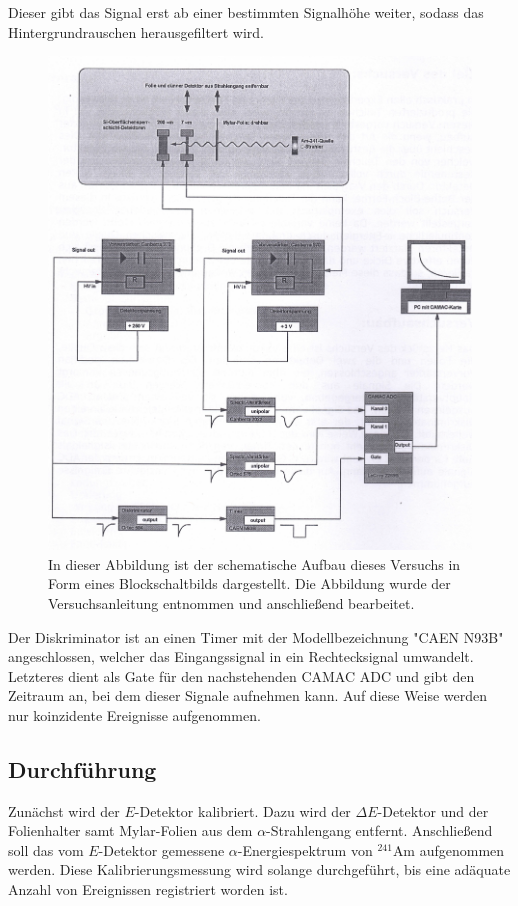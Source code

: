 Dieser gibt das Signal erst ab einer bestimmten Signalhöhe weiter, sodass das Hintergrundrauschen herausgefiltert wird.
\begin{figure}[H]
	\centering
	\includegraphics[width=\textwidth]{img/Aufbau}
	\caption{In dieser Abbildung ist der schematische Aufbau dieses Versuchs in Form eines Blockschaltbilds dargestellt. Die Abbildung wurde der Versuchsanleitung\cite{wwu} entnommen und anschließend bearbeitet.}
	\label{Aufbau}
\end{figure}
Der Diskriminator ist an einen Timer mit der Modellbezeichnung "CAEN N93B" angeschlossen, welcher das Eingangssignal in ein Rechtecksignal umwandelt.
Letzteres dient als Gate für den nachstehenden CAMAC ADC und gibt den Zeitraum an, bei dem dieser Signale aufnehmen kann.
Auf diese Weise werden nur koinzidente Ereignisse aufgenommen.

\subsection{Durchführung}

Zunächst wird der $E$-Detektor kalibriert.
Dazu wird der $\Delta E$-Detektor und der Folienhalter samt Mylar-Folien aus dem $\alpha$-Strahlengang entfernt.
Anschließend soll das vom $E$-Detektor gemessene $\alpha$-Energiespektrum von $^{241}$Am aufgenommen werden.
Diese Kalibrierungsmessung wird solange durchgeführt, bis eine adäquate Anzahl von Ereignissen registriert worden ist.

